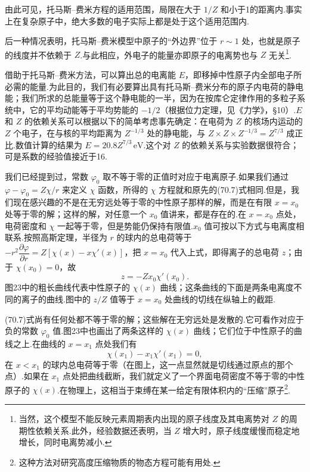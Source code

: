 由此可见，托马斯–费米方程的适用范围，局限在大于 $1/Z$ 和小于1的距离内.事实上在复杂原子中，绝大多数的电子实际上都是处于这个适用范围内.

后一种情况表明，托马斯–费米模型中原子的“外边界”位于 $r\sim1$ 处，也就是原子的线度并不依赖于 $Z$.与此相应，外电子的能量亦即原子的电离势也与 $Z$ 无关\footnote{当然，这个模型不能反映元素周期表内出现的原子线度及其电离势对 $Z$ 的周期性依赖关系.此外，经验数据还表明，当 $Z$ 增大时，原子线度缓慢而稳定地增长，同时电离势减小.}.

借助于托马斯–费米方法，可以算出总的电离能 $E$，即移掉中性原子内全部电子所必需的能量.为此目的，我们有必要算出具有托马斯–费米分布的原子内电荷的静电能；我们所求的总能量等于这个静电能的一半，因为在按库仑定律作用的多粒子系统中，它的平均动能等于平均势能的 $-1/2$（根据位力定理，见《力学》，§10）.$E$ 和 $Z$ 的依赖关系可以根据以下的简单考虑事先确定：在电荷为 $Z$ 的核场内运动的 $Z$ 个电子，在与核的平均距离为 $Z^{-1/3}$ 处的静电能，与 $Z\times Z\times Z^{-1/3}=Z^{7/3}$ 成正比.数值计算的结果为 $E=20.8Z^{7/3}\,\mathrm{eV}$.这个对 $Z$ 的依赖关系与实验数据很符合；可是系数的经验值接近于16.

我们已经提到过，常数 $\varphi_0$ 取不等于零的正值时对应于电离原子.如果我们通过 $\varphi-\varphi_0=Z\chi/r$ 来定义 $\chi$ 函数，所得的 $\chi$ 方程就和原先的(70.7)式相同.但是，我们现在感兴趣的不是在无穷远处等于零的中性原子那样的解，而是在有限 $x=x_0$ 处等于零的解；这样的解，对任意一个 $x_0$ 值讲来，都是存在的.在 $x=x_0$ 点处，电荷密度和 $\chi$ 一起等于零，但是势能仍保持有限值.$x_0$ 值可按以下方式与电离度相联系.按照高斯定理，半径为 $r$ 的球内的总电荷等于 $-r^{2}\dfrac{\partial\varphi}{\partial r}=Z\left[\chi(x)-x\chi'(x)\right]$，把 $x=x_0$ 代入上式，即得离子的总电荷 $z$；由于 $\chi(x_0)=0$，故
\begin{equation}
  z=-Zx_0\chi'(x_0).
\end{equation}
图23中的粗长曲线代表中性原子的 $\chi(x)$ 曲线；这条曲线的下面是两条电离度不同的离子的曲线.图中的 $z/Z$ 值等于 $x=x_0$ 处曲线的切线在纵轴上的截距.

(70.7)式尚有任何处都不等于零的解；这些解在无穷远处是发散的.它可看作对应于负的常数 $\varphi_0$ 值.图23中也画出了两条这样的 $\chi(x)$ 曲线；它们位于中性原子的曲线之上.在曲线的 $x=x_1$ 点处我们有
\begin{equation}
  \chi(x_1)-x_1\chi'(x_1)=0,
\end{equation}
在 $x<x_1$ 的球内总电荷等于零（在图上，这一点显然就是切线通过原点的那个点）.如果在 $x_1$ 点处把曲线截断，我们就定义了一个界面电荷密度不等于零的中性原子的 $\chi(x)$.在物理上，这相当于束缚在某一给定有限体积内的“压缩”原子\footnote{这种方法对研究高度压缩物质的物态方程可能有用处.}.

